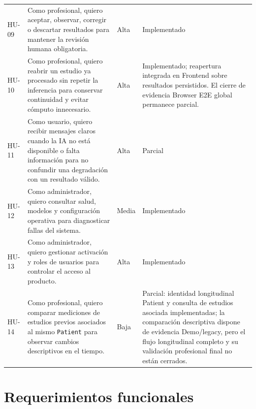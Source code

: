 {\begin{longtable}{>{\raggedright\arraybackslash}p{} >{\raggedright\arraybackslash}p{} >{\raggedright\arraybackslash}p{} >{\raggedright\arraybackslash}p{}}
HU-09 & Como profesional, quiero aceptar, observar, corregir o descartar resultados para mantener la revisión humana obligatoria. & Alta & Implementado \\
HU-10 & Como profesional, quiero reabrir un estudio ya procesado sin repetir la inferencia para conservar continuidad y evitar cómputo innecesario. & Alta & Implementado; reapertura integrada en Frontend sobre resultados persistidos. El cierre de evidencia Browser E2E global permanece parcial. \\
HU-11 & Como usuario, quiero recibir mensajes claros cuando la IA no está disponible o falta información para no confundir una degradación con un resultado válido. & Alta & Parcial \\
HU-12 & Como administrador, quiero consultar salud, modelos y configuración operativa para diagnosticar fallas del sistema. & Media & Implementado \\
HU-13 & Como administrador, quiero gestionar activación y roles de usuarios para controlar el acceso al producto. & Alta & Implementado \\
HU-14 & Como profesional, quiero comparar mediciones de estudios previos asociados al mismo \texttt{Patient} para observar cambios descriptivos en el tiempo. & Baja & Parcial: identidad longitudinal Patient y consulta de estudios asociada implementadas; la comparación descriptiva dispone de evidencia Demo/legacy, pero el flujo longitudinal completo y su validación profesional final no están cerrados. \\
\hline
\end{longtable}
}

\section{Requerimientos funcionales}

